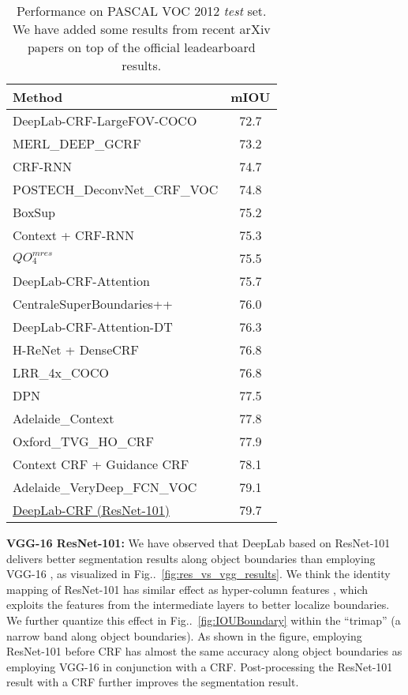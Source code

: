 \documentclass[10pt,journal,compsoc]{IEEEtran}
\makeatletter
\newcommand{\figref}[1]{Fig\onedot~\ref{#1}}
\def\onedot{\ifx\@let@token.\else.\null\fi\xspace}
\makeatother
\begin{document}
\begin{table}[!th]
  \centering
  \addtolength{\tabcolsep}{2.5pt}
  \begin{tabular}{l | c}
    \toprule[0.2 em]
    {\bf Method} & {\bf mIOU} \\
    \toprule[0.2 em]
DeepLab-CRF-LargeFOV-COCO \cite{papandreou2015weakly} & 72.7\\
    MERL\_DEEP\_GCRF \cite{Vemulapalli2016Gaussian} & 73.2 \\
    CRF-RNN \cite{zheng2015conditional} & 74.7 \\
    POSTECH\_DeconvNet\_CRF\_VOC \cite{noh2015learning} & 74.8 \\
    BoxSup \cite{dai2015boxsup} & 75.2 \\
    Context + CRF-RNN \cite{yu2015multi} & 75.3 \\
    $QO_4^{mres}$ \cite{chandra2016fast} & 75.5 \\
    DeepLab-CRF-Attention \cite{chen2015attention} & 75.7 \\
    CentraleSuperBoundaries++ \cite{kokkinos2016pushing} & 76.0 \\
    DeepLab-CRF-Attention-DT  \cite{chen2015semantic} & 76.3 \\
    H-ReNet + DenseCRF \cite{yan2016combining} & 76.8 \\
    LRR\_4x\_COCO \cite{ghiasi2016laplacian} & 76.8 \\
    DPN \cite{liu2015semantic} & 77.5 \\
    Adelaide\_Context \cite{lin2015efficient} & 77.8 \\
    Oxford\_TVG\_HO\_CRF \cite{arnab2015higher} & 77.9 \\
    Context CRF + Guidance CRF \cite{Shen2016Fast} & 78.1 \\
    Adelaide\_VeryDeep\_FCN\_VOC \cite{wu2016bridging} & 79.1 \\
    \midrule
    \href{http://host.robots.ox.ac.uk:8080/anonymous/FLHY8R.html}{DeepLab-CRF (ResNet-101)} & 79.7 \\
\bottomrule[0.1 em]
  \end{tabular}
  \caption{Performance on PASCAL VOC 2012 {\it test} set. We have added some
    results from recent arXiv papers on top of the official leadearboard results.}
  \label{tab:res_testset}
\end{table}

\textbf{VGG-16 \vs ResNet-101:} We have observed that DeepLab based on ResNet-101 \cite{he2015deep}
delivers better segmentation results along object boundaries than employing VGG-16 \cite{simonyan2014very}, as
visualized in \figref{fig:res_vs_vgg_results}. We think the identity mapping \cite{he2016identity} of ResNet-101
has similar effect as hyper-column features \cite{hariharan2014hypercolumns}, which exploits the features from
the intermediate layers to better localize boundaries. We further quantize this effect in \figref{fig:IOUBoundary} within the
``trimap'' \cite{kohli2009robust, krahenbuhl2011efficient} (a narrow band along object boundaries). As shown in
the figure, employing ResNet-101 before CRF has almost the same accuracy along object boundaries as employing
VGG-16 in conjunction with a CRF. Post-processing the ResNet-101 result with a CRF further improves the segmentation
result.
\end{document}
